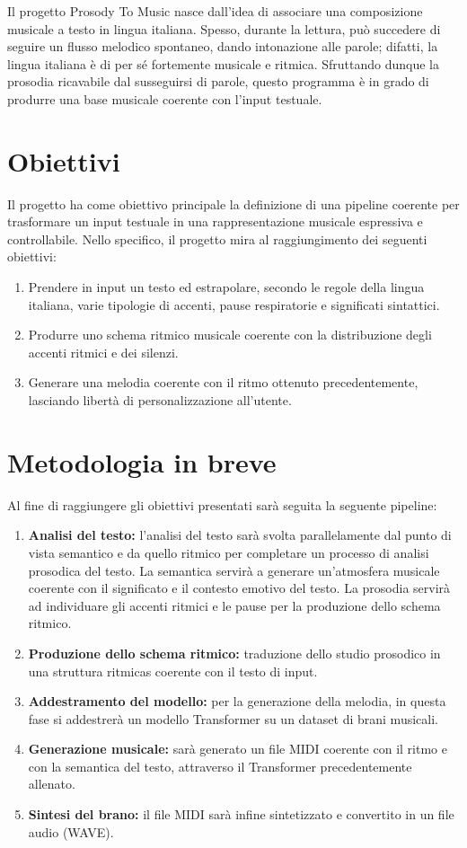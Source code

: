 Il progetto Prosody To Music nasce dall'idea di associare una composizione musicale a testo in lingua italiana.
Spesso, durante la lettura, può succedere di seguire un flusso melodico spontaneo, dando intonazione alle parole; difatti, la lingua italiana è di 
per sé fortemente musicale e ritmica.
Sfruttando dunque la prosodia ricavabile dal susseguirsi di parole, questo programma è in grado di produrre una base musicale 
coerente con l'input testuale.


\section{Obiettivi}
Il progetto ha come obiettivo principale la definizione di una pipeline coerente per trasformare un input testuale in una rappresentazione musicale espressiva 
e controllabile.
Nello specifico, il progetto mira al raggiungimento dei seguenti obiettivi:

\begin{enumerate}
    \item Prendere in input un testo ed estrapolare, secondo le regole della lingua italiana, varie tipologie di accenti, pause respiratorie e 
    significati sintattici.
    \item Produrre uno schema ritmico musicale coerente con la distribuzione degli accenti ritmici e dei silenzi.
    \item Generare una melodia coerente con il ritmo ottenuto precedentemente, lasciando libertà di personalizzazione all'utente.
\end{enumerate}
\section{Metodologia in breve}
Al fine di raggiungere gli obiettivi presentati sarà seguita la seguente pipeline:
\begin{enumerate}
    \item \textbf{Analisi del testo:} l'analisi del testo sarà svolta parallelamente dal punto di vista semantico e da quello ritmico per completare un processo di analisi prosodica del testo.  La semantica servirà a generare un'atmosfera musicale coerente con il significato e il contesto emotivo del testo. La prosodia servirà ad individuare gli accenti ritmici e le pause per la produzione dello schema ritmico.
    \item \textbf{Produzione dello schema ritmico:} traduzione dello studio prosodico in una struttura ritmicas coerente con il testo di input.
    \item \textbf{Addestramento del modello:} per la generazione della melodia, in questa fase si addestrerà un modello Transformer su un dataset di brani musicali.
    \item \textbf{Generazione musicale:} sarà generato un file MIDI coerente con il ritmo e con la semantica del testo, attraverso il Transformer precedentemente allenato.
    \item \textbf{Sintesi del brano:} il file MIDI sarà infine sintetizzato e convertito in un file audio (WAVE).      
\end{enumerate}



